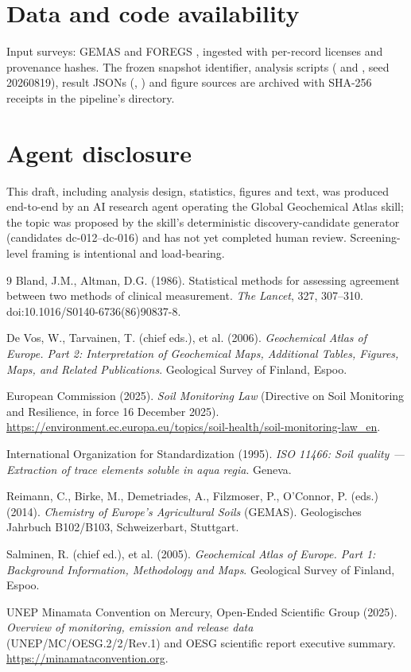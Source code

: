 \documentclass[11pt]{article}
\begin{document}
\section*{Data and code availability}
Input surveys: GEMAS \cite{reimann2014} and FOREGS
\cite{salminen2005,devos2006}, ingested with per-record licenses and
provenance hashes. The frozen snapshot identifier, analysis scripts
( and , seed 20260819),
result JSONs (,
) and figure sources are archived with
SHA-256 receipts in the pipeline's
 directory.

\section*{Agent disclosure}
This draft, including analysis design, statistics, figures and text, was
produced end-to-end by an AI research agent operating the Global
Geochemical Atlas skill; the topic was proposed by the skill's
deterministic discovery-candidate generator (candidates dc-012--dc-016) and
has not yet completed human review. Screening-level framing is intentional
and load-bearing.

\begin{thebibliography}{9}
Bland, J.M., Altman, D.G. (1986). Statistical methods for assessing
agreement between two methods of clinical measurement. \emph{The Lancet},
327, 307--310. doi:10.1016/S0140-6736(86)90837-8.

De Vos, W., Tarvainen, T. (chief eds.), et al. (2006). \emph{Geochemical
Atlas of Europe. Part 2: Interpretation of Geochemical Maps, Additional
Tables, Figures, Maps, and Related Publications}. Geological Survey of
Finland, Espoo.

European Commission (2025). \emph{Soil Monitoring Law} (Directive on Soil
Monitoring and Resilience, in force 16 December 2025).
\url{https://environment.ec.europa.eu/topics/soil-health/soil-monitoring-law_en}.

International Organization for Standardization (1995). \emph{ISO 11466:
Soil quality --- Extraction of trace elements soluble in aqua regia}.
Geneva.

Reimann, C., Birke, M., Demetriades, A., Filzmoser, P., O'Connor, P. (eds.)
(2014). \emph{Chemistry of Europe's Agricultural Soils} (GEMAS).
Geologisches Jahrbuch B102/B103, Schweizerbart, Stuttgart.

Salminen, R. (chief ed.), et al. (2005). \emph{Geochemical Atlas of Europe.
Part 1: Background Information, Methodology and Maps}. Geological Survey of
Finland, Espoo.

UNEP Minamata Convention on Mercury, Open-Ended Scientific Group (2025).
\emph{Overview of monitoring, emission and release data}
(UNEP/MC/OESG.2/2/Rev.1) and OESG scientific report executive summary.
\url{https://minamataconvention.org}.
\end{thebibliography}
\end{document}
